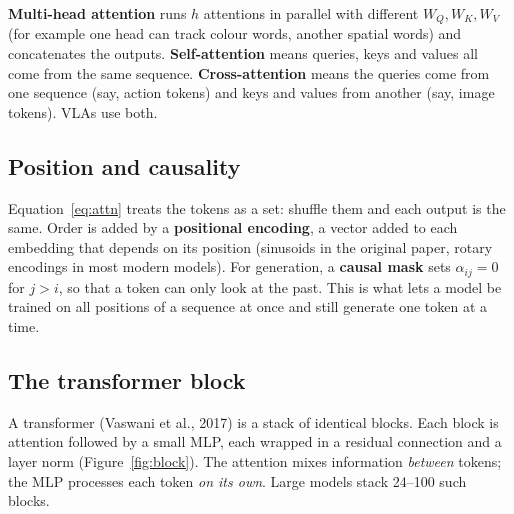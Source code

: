 \textbf{Multi-head attention} runs $h$ attentions in parallel with different $W_Q,W_K,W_V$ (for example one head can track colour words, another spatial words) and concatenates the outputs. \textbf{Self-attention} means queries, keys and values all come from the same sequence. \textbf{Cross-attention} means the queries come from one sequence (say, action tokens) and keys and values from another (say, image tokens). VLAs use both.

\subsection{Position and causality}
Equation~\eqref{eq:attn} treats the tokens as a set: shuffle them and each output is the same. Order is added by a \textbf{positional encoding}, a vector added to each embedding that depends on its position (sinusoids in the original paper, rotary encodings in most modern models). For generation, a \textbf{causal mask} sets $\alpha_{ij}=0$ for $j>i$, so that a token can only look at the past. This is what lets a model be trained on all positions of a sequence at once and still generate one token at a time.

\subsection{The transformer block}
A transformer (Vaswani et al., 2017) is a stack of identical blocks. Each block is attention followed by a small MLP, each wrapped in a residual connection and a layer norm (Figure~\ref{fig:block}). The attention mixes information \emph{between} tokens; the MLP processes each token \emph{on its own}. Large models stack 24--100 such blocks.

